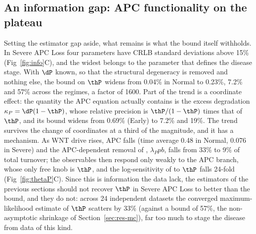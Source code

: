 \subsection{An information gap: APC functionality on the \texorpdfstring{\bcat{}}{beta-catenin} plateau}
\label{sec:res-thetaP}

Setting the estimator gap aside, what remains is what the bound itself
withholds.
In Severe APC Loss four parameters have CRLB standard deviations above 15\%
(Fig~\ref{fig:info}C), and the widest belongs to the parameter that defines the
disease stage. With $\dP$ known, so that the structural degeneracy is removed
and nothing else, the bound on $\thP$ widens from 0.04\% in Normal to 0.23\%,
7.2\% and 57\% across the regimes, a factor of 1600. Part of the trend is a
coordinate effect: the quantity the APC equation actually contains is the
excess degradation $\kappa_P=\dP(1-\thP)$, whose relative precision is
$\thP/(1-\thP)$ times that of $\thP$, and its bound widens from 0.69\% (Early)
to 7.2\% and 19\%. The trend survives the change of coordinates at a third of
the magnitude, and it has a mechanism. As WNT drive rises, APC falls (time
average 0.48 in Normal, 0.076 in Severe) and the APC-dependent removal of
\bcat{}, $\lambda_P p b$, falls from 33\% to 9\% of total \bcat{} turnover; the
observables then respond only weakly to the APC branch, whose only free knob is
$\thP$, and the log-sensitivity of \bcat{} to $\thP$ falls 24-fold
(Fig~\ref{fig:thetaP}C). Since this is information the data lack, the
estimators of the previous sections should not recover $\thP$ in Severe APC
Loss to better than the bound, and they do not: across 24 independent datasets
the converged maximum-likelihood estimate of $\thP$ scatters by 33\% (against a
bound of 57\%, the non-asymptotic shrinkage of Section~\ref{sec:res-mc}), far
too much to stage the disease from data of this kind.

